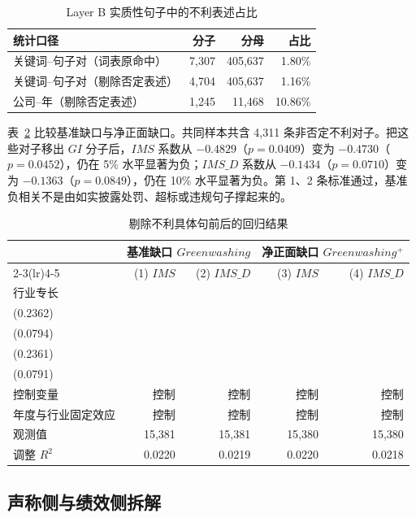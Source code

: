\documentclass[12pt,a4paper]{article}
\begin{document}
\begin{table}[htbp]
\centering
\caption{Layer B 实质性句子中的不利表述占比}
\label{tab:adverse_share}
\begin{tabular}{lrrr}
\toprule
统计口径 & 分子 & 分母 & 占比 \\
\midrule
关键词--句子对（词表原命中） & 7,307 & 405,637 & 1.80\% \\
关键词--句子对（剔除否定表述） & 4,704 & 405,637 & 1.16\% \\
公司--年（剔除否定表述） & 1,245 & 11,468 & 10.86\% \\
\bottomrule
\end{tabular}
\end{table}

表~\ref{tab:gi_plus} 比较基准缺口与净正面缺口。共同样本共含 4,311 条非否定不利对子。把这些对子移出 $GI$ 分子后，$IMS$ 系数从 $-0.4829$（$p=0.0409$）变为 $-0.4730$（$p=0.0452$），仍在 5\% 水平显著为负；$IMS\_D$ 系数从 $-0.1434$（$p=0.0710$）变为 $-0.1363$（$p=0.0849$），仍在 10\% 水平显著为负。第 1、2 条标准通过，基准负相关不是由如实披露处罚、超标或违规句子撑起来的。

\begin{table}[htbp]
\centering
\caption{剔除不利具体句前后的回归结果}
\label{tab:gi_plus}
\renewcommand{\arraystretch}{1.25}
\begin{tabular}{lrrrr}
\toprule
 & \multicolumn{2}{c}{基准缺口 $Greenwashing$} & \multicolumn{2}{c}{净正面缺口 $Greenwashing^+$} \\
\cmidrule(lr){2-3}\cmidrule(lr){4-5}
 & (1) $IMS$ & (2) $IMS\_D$ & (3) $IMS$ & (4) $IMS\_D$ \\
\midrule
行业专长 & \shortstack{$-0.4829^{**}$\\(0.2362)} & \shortstack{$-0.1434^{*}$\\(0.0794)} & \shortstack{$-0.4730^{**}$\\(0.2361)} & \shortstack{$-0.1363^{*}$\\(0.0791)} \\
控制变量 & 控制 & 控制 & 控制 & 控制 \\
年度与行业固定效应 & 控制 & 控制 & 控制 & 控制 \\
观测值 & 15,381 & 15,381 & 15,380 & 15,380 \\
调整 $R^2$ & 0.0220 & 0.0219 & 0.0220 & 0.0218 \\
\bottomrule
\end{tabular}
\end{table}

\subsection{声称侧与绩效侧拆解}
\end{document}
